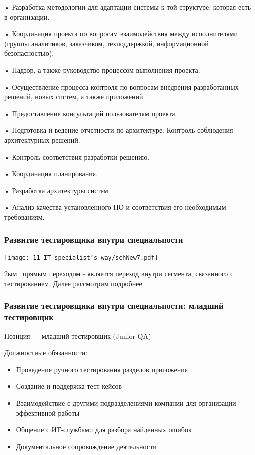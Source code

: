 \documentclass{../industrial-development}
\begin{document}
•	Разработка методологии для адаптации системы к той структуре, которая есть в организации. 

•	Координация проекта по вопросам взаимодействия между исполнителями (группы аналитиков, заказчиком, техподдержкой, информационной безопасностью). 

•	Надзор, а также руководство процессом выполнения проекта. 

•	Осуществление процесса контроля по вопросам внедрения разработанных решений, новых систем, а также приложений. 

•	Предоставление консультаций пользователям проекта. 

•	Подготовка и ведение отчетности по архитектуре. Контроль соблюдения архитектурных решений.

•	 Контроль соответствия разработки решению. 

•	Координация планирования.

•	 Разработка архитектуры систем. 

•	Анализ качества установленного ПО и соответствия его необходимым требованиям. 


\begin{frame} \frametitle{Развитие тестировщика внутри специальности }
  \centerline{\texttt{[image: 11-IT-specialist's-way/schNew7.pdf]}}
\end{frame}
\lecturenotes

 2ым~\cite{mc} прямым переходом  - является переход внутри сегмента, связанного с тестированием. Далее рассмотрим подробнее


\begin{frame} \frametitle{Развитие тестировщика внутри специальности: младший тестировщик}
 \begin{block}{}
  \alert{Позиция --- младший тестировщик (Junior QA)}

Должностные обязанности: 
  \end{block}
  \begin{itemize}
  \item Проведение ручного тестирования разделов приложения
  \item Создание и поддержка тест-кейсов
  \item Взаимодействие с другими подразделениями компании для организации эффективной работы
 \item Общение с ИТ-службами для разбора найденных ошибок
\item Документальное сопровождение деятельности
  \end{itemize}
\end{frame}
\end{document}
